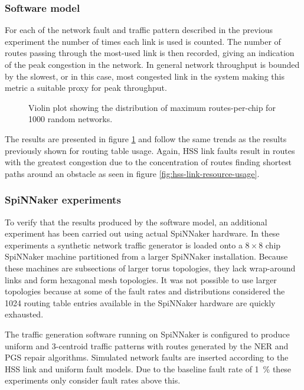 			\subsubsection{Software model}
			
				For each of the network fault and traffic pattern described in the
				previous experiment the number of times each link is used is counted.
				The number of routes passing through the most-used link is then
				recorded, giving an indication of the peak congestion in the network.
				In general network throughput is bounded by the slowest, or in this
				case, most congested link in the system \cite{dally04} making this
				metric a suitable proxy for peak throughput.
				
				\begin{figure}
					\center
					
					\caption{Violin plot showing the distribution of maximum
					routes-per-chip for \num{1000} random networks.}
					\label{fig:routing-resource}
				\end{figure}
				
				The results are presented in figure \ref{fig:routing-resource} and
				follow the same trends as the results previously shown for routing
				table usage.  Again, HSS link faults result in routes with the greatest
				congestion due to the concentration of routes finding shortest paths
				around an obstacle as seen in figure \ref{fig:hss-link-resource-usage}.
			
			\subsubsection{SpiNNaker experiments}
			
				To verify that the results produced by the software model, an
				additional experiment has been carried out using actual SpiNNaker
				hardware. In these experiments a synthetic network traffic generator is
				loaded onto a $8\times8$ chip SpiNNaker machine partitioned from a
				larger SpiNNaker installation.  Because these machines are subsections
				of larger torus topologies, they lack wrap-around links and form
				hexagonal mesh topologies. It was not possible to use larger topologies
				because at some of the fault rates and distributions considered the
				\num{1024} routing table entries available in the SpiNNaker hardware
				are quickly exhausted.
				
				The traffic generation software running on SpiNNaker is configured to
				produce uniform and 3-centroid traffic patterns with routes generated
				by the NER and PGS repair algorithms. Simulated network faults are
				inserted according to the HSS link and uniform fault models. Due to the
				baseline fault rate of \SI{1}{\percent} these experiments only consider
				fault rates above this.
				

